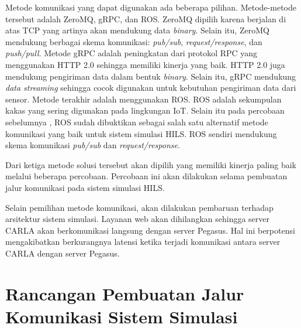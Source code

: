 Metode komunikasi yang dapat digunakan ada beberapa pilihan. Metode-metode
tersebut adalah ZeroMQ, gRPC, dan ROS. ZeroMQ dipilih karena berjalan di atas
TCP yang artinya akan mendukung data \textit{binary}. Selain itu, ZeroMQ
mendukung berbagai skema komunikasi: \textit{pub/sub},
\textit{request/response}, dan \textit{push/pull}. Metode gRPC adalah
peningkatan dari protokol RPC yang menggunakan HTTP 2.0 sehingga memiliki
kinerja yang baik. HTTP 2.0 juga mendukung pengiriman data dalam bentuk
\textit{binary}.  Selain itu, gRPC mendukung \textit{data streaming} sehingga
cocok digunakan untuk kebutuhan pengiriman data dari sensor. Metode terakhir
adalah menggunakan ROS. ROS adalah sekumpulan kakas yang sering digunakan pada
lingkungan IoT. Selain itu pada percobaan sebelumnya
\parencite{brogle_CarlaHILS}, ROS sudah dibuktikan sebagai salah satu alternatif
metode komunikasi yang baik untuk sistem simulasi HILS. ROS sendiri mendukung
skema komunikasi \textit{pub/sub} dan \textit{request/response}.

Dari ketiga metode solusi tersebut akan dipilih yang memiliki kinerja paling
baik melalui beberapa percobaan. Percobaan ini akan dilakukan selama pembuatan
jalur komunikasi pada sistem simulasi HILS.

Selain pemilihan metode komunikasi, akan dilakukan pembaruan terhadap arsitektur
sistem simulasi. Layanan web akan dihilangkan sehingga server CARLA akan
berkomunikasi langsung dengan server Pegasus. Hal ini berpotensi mengakibatkan
berkurangnya latensi ketika terjadi komunikasi antara server CARLA dengan server
Pegasus.

\section{Rancangan Pembuatan Jalur Komunikasi Sistem Simulasi}

\blindtext